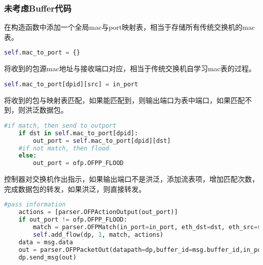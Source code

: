 \documentclass{xjtureport}
\begin{document}
\subsubsection{未考虑Buffer代码}
在构造函数中添加一个全局mac与port映射表，相当于存储所有传统交换机的mac表。
\begin{lstlisting}[language=Python]
	self.mac_to_port = {}
\end{lstlisting}
\quad \quad 将收到的包源mac地址与接收端口对应，相当于传统交换机自学习mac表的过程。
\begin{lstlisting}[language=Python]
	self.mac_to_port[dpid][src] = in_port
\end{lstlisting}
\quad \quad 将收到的包与映射表匹配，如果能匹配到，则输出端口为表中端口，如果匹配不到，则洪泛数据包。
\begin{lstlisting}[language=Python]
	#if match, then send to outport
	if dst in self.mac_to_port[dpid]:
		out_port = self.mac_to_port[dpid][dst]
	#if not match, then flood
	else:
		out_port = ofp.OFPP_FLOOD
\end{lstlisting}
\quad \quad 控制器对交换机作出指示，如果输出端口不是洪泛，添加流表项，增加匹配次数，完成数据包的转发，如果洪泛，则直接转发。
\begin{lstlisting}[language=Python]	
	#pass information
	actions = [parser.OFPActionOutput(out_port)]
	if out_port != ofp.OFPP_FLOOD:
		match = parser.OFPMatch(in_port=in_port, eth_dst=dst, eth_src=src)
		self.add_flow(dp, 1, match, actions)
	data = msg.data	
	out = parser.OFPPacketOut(datapath=dp,buffer_id=msg.buffer_id,in_port=in_port, actions=actions, data=data)
	dp.send_msg(out)	
\end{lstlisting}
\end{document}
